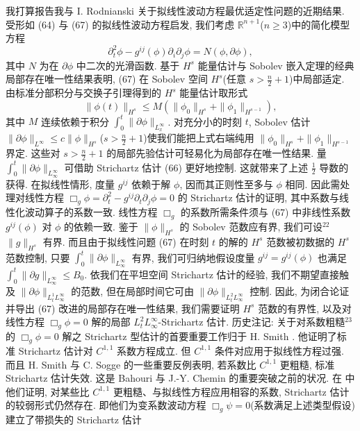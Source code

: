 我打算报告我与 I. Rodnianski \cite{klai42} 关于拟线性波动方程最优适定性问题的近期结果. 受形如 (64) 与 (67) 的拟线性波动方程启发, 我们考虑 $\mathbb{R}^{n+1}$($n \geq 3$)中的简化模型方程
\[
\partial_{t}^{2}\phi-g^{i j}(\phi)\partial_{i}\partial_{j}\phi=N(\phi,\partial\phi),
\]
其中 $N$ 为在 $\partial\phi$ 中二次的光滑函数. 基于 $H^{s}$ 能量估计与 Sobolev 嵌入定理的经典局部存在唯一性结果表明, (67) 在 Sobolev 空间 $H^{s}$(任意 $s > \frac{n}{2} + 1$)中局部适定. 由标准分部积分与交换子引理得到的 $H^{s}$ 能量估计取形式
\[
\|\phi(t)\|_{H^{s}}\leq M(\|\phi_{0}\|_{H^{s}}+\|\phi_{1}\|_{H^{s-1}}),
\]
其中 $M$ 连续依赖于积分 $\int_0^t \|\partial\phi\|_{L_x^\infty}$. 对充分小的时刻 $t$, Sobolev 估计 $\|\partial\phi\|_{L^\infty} \leq c\|\phi\|_{H^s}$($s > \frac{n}{2} + 1$)使我们能把上式右端纯用 $\|\phi_0\|_{H^s} + \|\phi_1\|_{H^{s-1}}$ 界定. 这些对 $s > \frac{n}{2} + 1$ 的局部先验估计可轻易化为局部存在唯一性结果.
量 $\int_0^t \|\partial\phi\|_{L_\infty^\infty}$ 可借助 Strichartz 估计 (66) 更好地控制. 这就带来了上述 $\frac{1}{2}$ 导数的获得.
在拟线性情形, 度量 $g^{ij}$ 依赖于解 $\phi$, 因而其正则性至多与 $\phi$ 相同. 因此需处理对线性方程 $\Box_g\phi = \partial_t^2 - g^{ij}\partial_t\partial_j\phi = 0$ 的 Strichartz 估计的证明, 其中系数与线性化波动算子的系数一致. 线性方程 $\Box_g$ 的系数所需条件须与 (67) 中非线性系数 $g^{ij}(\phi)$ 对 $\phi$ 的依赖一致. 鉴于 $\|\phi\|_{H^s}$ 的 Sobolev 范数应有界, 我们可设$^{22}$ $\|g\|_{H^s}$ 有界. 而且由于拟线性问题 (67) 在时刻 $t$ 的解的 $H^s$ 范数被初数据的 $H^s$ 范数控制, 只要 $\int_0^t\|\partial\phi\|_{L_\infty^\infty}$ 有界, 我们可归纳地假设度量 $g^{ij} = g^{ij}(\phi)$ 也满足 $\int_0^t\|\partial g\|_{L_\infty^\infty} \leq B_0$. 依我们在平坦空间 Strichartz 估计的经验, 我们不期望直接触及 $\|\partial\phi\|_{L_t^1L_\infty^\infty}$ 的范数, 但在局部时间它可由 $\|\partial\phi\|_{L_t^2L_\infty^\infty}$ 控制. 因此, 为闭合论证并导出 (67) 改进的局部存在唯一性结果, 我们需要证明 $H^s$ 范数的有界性, 以及对线性方程 $\Box_g\phi = 0$ 解的局部 $L_t^2L_\infty^\infty$-Strichartz 估计.
历史注记: 关于对系数粗糙$^{23}$ 的 $\Box_g \phi = 0$ 解之 Strichartz 型估计的首要重要工作归于 H. Smith \cite{klai60}. 他证明了标准 Strichartz 估计对 $C^{1,1}$ 系数方程成立. 但 $C^{1,1}$ 条件对应用于拟线性方程过强. 而且 H. Smith 与 C. Sogge \cite{klai61} 的一些重要反例表明, 若系数比 $C^{1,1}$ 更粗糙, 标准 Strichartz 估计失效.
这是 Bahouri 与 J.-Y. Chemin 的重要突破之前的状况. 在 \cite{klai1} 中他们证明, 对某些比 $C^{1,1}$ 更粗糙、与拟线性方程应用相容的系数, Strichartz 估计的较弱形式仍然存在. 即他们为变系数波动方程 $\Box_g \psi = 0$(系数满足上述类型假设)建立了带损失的 Strichartz 估计
